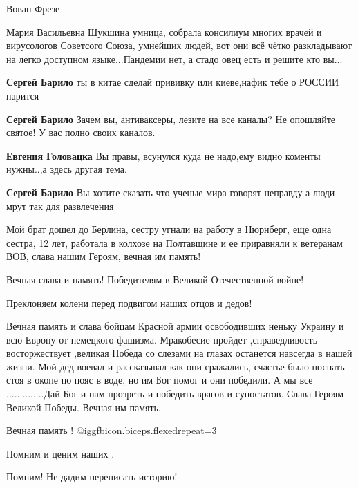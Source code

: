 \begin{itemize}
\begin{itemize}
\end{itemize} %

Вован Фрезе

Мария Васильевна Шукшина умница, собрала консилиум многих врачей и вирусологов
Советсого Союза, умнейших людей, вот они всё чётко разкладывают на легко
доступном языке...Пандемии нет, а стадо овец есть и решите кто вы...

\begin{itemize} %
\textbf{Сергей Барило} ты в китае сделай прививку или киеве,нафик тебе о РОССИИ парится

\textbf{Сергей Барило} Зачем вы, антиваксеры, лезите на все каналы? Не опошляйте святое! У вас полно своих каналов.

\textbf{Евгения Головацка} Вы правы, всунулся куда не надо,ему видно коменты нужны..,а здесь другая тема.

\textbf{Сергей Барило} Вы хотите сказать что ученые мира говорят неправду а люди мрут так для развлечения
\end{itemize} %


Мой брат дошел до Берлина, сестру угнали на работу в Нюрнберг, еще одна сестра, 12
лет, работала в колхозе на Полтавщине и ее приравняли к ветеранам ВОВ, слава
нашим Героям, вечная им память!

Вечная слава и память! Победителям в Великой Отечественной войне!

Преклоняем колени перед подвигом наших отцов и дедов!


Вечная память и слава бойцам Красной армии освободивших неньку Украину и всю
Европу от немецкого фашизма. Мракобесие пройдет ,справедливость восторжествует
,великая Победа со слезами на глазах останется навсегда в нашей жизни. Мой дед
воевал и рассказывал как они сражались, счастье было поспать стоя в окопе по
пояс в воде, но им Бог помог и они победили. А мы все ..............Дай Бог и нам
прозреть и победить врагов и супостатов. Слава Героям Великой Победы. Вечная им
память.

Вечная память ! @igg{fbicon.biceps.flexed}{repeat=3} 

Помним и ценим наших .

Помним! Не дадим переписать историю!


\end{itemize}
